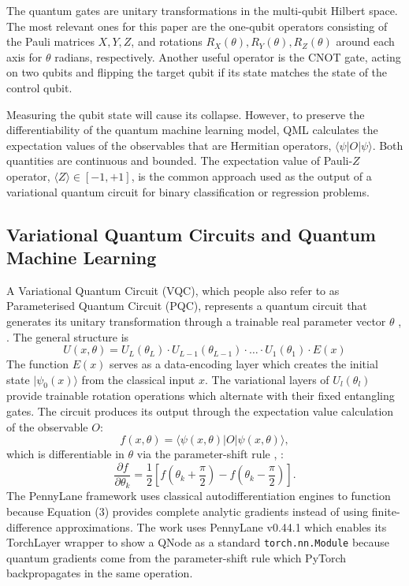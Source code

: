\documentclass{ieeeaccess}
\begin{document}
The quantum gates are unitary transformations in the multi-qubit Hilbert space. The most relevant ones for this paper are the one-qubit operators consisting of the Pauli matrices $X, Y, Z$, and rotations $R_X(\theta), R_Y(\theta), R_Z(\theta)$ around each axis for $\theta$ radians, respectively. Another useful operator is the CNOT gate, acting on two qubits and flipping the target qubit if its state matches the state of the control qubit.

Measuring the qubit state will cause its collapse. However, to preserve the differentiability of the quantum machine learning model, QML calculates the expectation values of the observables that are Hermitian operators, $\langle \psi|O|\psi \rangle$. Both quantities are continuous and bounded. The expectation value of Pauli-$Z$ operator, $\langle Z \rangle \in [-1, +1]$, is the common approach used as the output of a variational quantum circuit for binary classification or regression problems.

\subsection{Variational Quantum Circuits and Quantum Machine Learning}
A Variational Quantum Circuit (VQC), which people also refer to as Parameterised Quantum Circuit (PQC), represents a quantum circuit that generates its unitary transformation through a trainable real parameter vector $\theta$ \cite{b10}, \cite{b24}. The general structure is
\begin{equation}
U(x, \theta) = U_L(\theta_L) \cdot U_{L-1}(\theta_{L-1}) \cdot \ldots \cdot U_1(\theta_1) \cdot E(x)
\end{equation}
The function $E(x)$ serves as a data-encoding layer which creates the initial state $|\psi_0(x)\rangle$ from the classical input $x$. The variational layers of $U_l(\theta_l)$ provide trainable rotation operations which alternate with their fixed entangling gates. The circuit produces its output through the expectation value calculation of the observable $O$:
\begin{equation}
f(x, \theta) = \langle \psi(x, \theta) | O | \psi(x, \theta) \rangle,
\end{equation}
which is differentiable in $\theta$ via the parameter-shift rule \cite{b22}, \cite{b23}:
\begin{equation}
\frac{\partial f}{\partial \theta_k} = \frac{1}{2} \left[ f\left(\theta_k + \frac{\pi}{2}\right) - f\left(\theta_k - \frac{\pi}{2}\right) \right].
\end{equation}
The PennyLane framework uses classical autodifferentiation engines to function because Equation (3) provides complete analytic gradients instead of using finite-difference approximations. The work uses PennyLane v0.44.1 which enables its TorchLayer wrapper to show a QNode as a standard \texttt{torch.nn.Module} because quantum gradients come from the parameter-shift rule which PyTorch backpropagates in the same operation.
\end{document}
